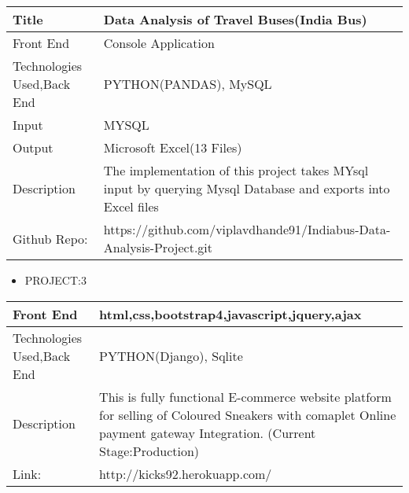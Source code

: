 \documentclass[a4paper,10pt]{article}
\begin{document}
\begin{tabu} to 0.9\textwidth { | X[l] | X[2.5] | }
 \hline
 \large Title & Data Analysis of Travel Buses(India Bus)\\
 
 \hline
\large Front End  & Console Application\\
 

 \hline
 \large Technologies Used,Back End    & PYTHON(PANDAS), MySQL \\
 
 \hline
\large Input  & MYSQL   \\


\hline
\large Output  & Microsoft Excel(13 Files)   \\
 
 \hline
\large Description & The implementation of this project takes MYsql input by querying Mysql Database and exports into Excel files \\


\hline
\large Github Repo: & https://github.com/viplavdhande91/Indiabus-Data-Analysis-Project.git \\
 
 
\hline
 

 
\end{tabu}
 
 
 
 
 \vspace{5mm}

 
 
 
 \begin{itemize}
   \item {\large PROJECT:3}
   
 \end{itemize}


\begin{tabu} to 0.9\textwidth { | X[l] | X[2.5] | }

 
 \hline
\large Front End  & html,css,bootstrap4,javascript,jquery,ajax\\
 

 \hline
 \large Technologies Used,Back End    & PYTHON(Django), Sqlite \\
 \hline
\large Description & This is fully functional E-commerce website platform for selling of Coloured Sneakers with comaplet Online payment gateway Integration.
\newline(Current Stage:Production)  \\
 

 

\hline
\large Link: & http://kicks92.herokuapp.com/ \\
 
 
\hline
 

 
\end{tabu}
 
\end{document}
